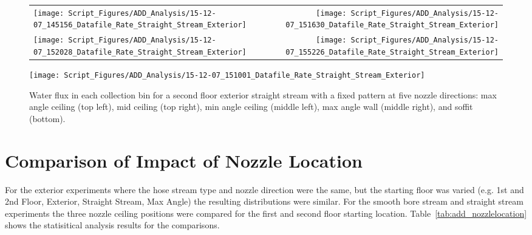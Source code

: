 \documentclass[12pt,oneside]{book}
\begin{document}
\begin{figure}[ht]
\begin{tabular*}{\textwidth}{lr}
\texttt{[image: Script\_Figures/ADD\_Analysis/15-12-07\_145156\_Datafile\_Rate\_Straight\_Stream\_Exterior]} &
\texttt{[image: Script\_Figures/ADD\_Analysis/15-12-07\_151630\_Datafile\_Rate\_Straight\_Stream\_Exterior]} \\
\texttt{[image: Script\_Figures/ADD\_Analysis/15-12-07\_152028\_Datafile\_Rate\_Straight\_Stream\_Exterior]} &
\texttt{[image: Script\_Figures/ADD\_Analysis/15-12-07\_155226\_Datafile\_Rate\_Straight\_Stream\_Exterior]} \\
\end{tabular*}
\centering
\texttt{[image: Script\_Figures/ADD\_Analysis/15-12-07\_151001\_Datafile\_Rate\_Straight\_Stream\_Exterior]}
\caption[Water Flux for Varying Nozzle Direction with Fixed Second Floor Exterior Straight Stream]{Water flux in each collection bin for a second floor exterior straight stream with a fixed pattern at five nozzle directions: max angle ceiling (top left), mid ceiling (top right), min angle ceiling (middle left), max angle wall (middle right), and soffit (bottom).}
\label{fig:Exterior_Second_Floor_Varying_Nozzle_Directions_SS_Fixed_Pattern}
\end{figure}

\clearpage

\section{Comparison of Impact of Nozzle Location}

For the exterior experiments where the hose stream type and nozzle direction were the same, but the starting floor was varied (e.g. 1st and 2nd Floor, Exterior, Straight Stream, Max Angle) the resulting distributions were similar. For the smooth bore stream and straight stream experiments the three nozzle ceiling positions were compared for the first and second floor starting location. Table~\ref{tab:add_nozzlelocation} shows the statisitical analysis results for the comparisons.
\end{document}
